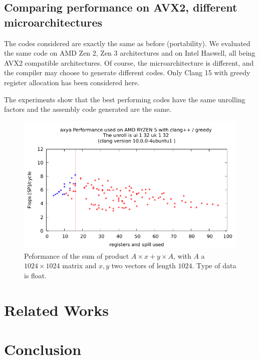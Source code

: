 \documentclass{article}
\begin{document}
\subsection{Comparing performance on AVX2, different microarchitectures}
The codes considered are exactly the same as before (portability). We evaluated the same code on AMD Zen 2, Zen 3 architectures and on Intel Haswell, all being AVX2 compatible architectures. Of course, the microarchitecture is different, and the compiler may choose to generate different codes. Only Clang 15 with greedy register allocation has been considered here. 

The experiments show that the best performing codes have the same unrolling factors and the assembly code generated are the same. 



\begin{figure}[h!]

  \includegraphics[width=\textwidth]{../autobench/datas/axya/axya_ui_1_32_uk_1_32.pdf}
  \caption{Peformance of the sum of product $A\times x+y\times A$, with $A$ a $1024\times1024$ matrix and $x,y$ two vectors of length $1024$. Type of data is float.}
\end{figure}


\section{Related Works}
\section{Conclusion}
\label{sec:conclusion}


\end{document}
